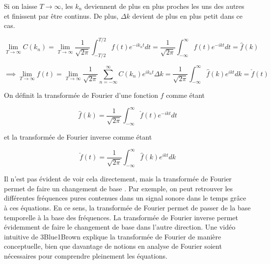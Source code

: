 Si on laisse $T \rightarrow \infty$, les $k_n$ deviennent de plus en plus proches les uns des autres et finissent par être continus. De plus, $\Delta k$ devient de plus en plus petit dans ce cas.

\begin{equation*}
    \lim_{T\rightarrow\infty} C(k_n) = \lim_{T\rightarrow\infty} \frac{1}{\sqrt{2\pi}}\int_{-T/2}^{T/2} f(t) e^{-i k_n t} dt = \frac{1}{\sqrt{2\pi}}\int_{-\infty}^{\infty} f(t) e^{-i k t} dt = \hat{f}(k)
\end{equation*}

\begin{equation*}
    \implies \lim_{T\rightarrow\infty} f(t) = \lim_{T\rightarrow\infty} \frac{1}{\sqrt{2\pi}} \sum_{n = -\infty}^{\infty} C(k_n) e^{i k_n t} \Delta k = \frac{1}{\sqrt{2\pi}} \int_{-\infty}^{\infty} \hat{f}(k) e^{ikt} dk = \check{f}(t)
\end{equation*}

On définit la transformée de Fourier d'une fonction $f$ comme étant 

\begin{equation}
    \hat{f}(k) = \frac{1}{\sqrt{2\pi}}\int_{-\infty}^{\infty} \check{f}(t) e^{-i k t} dt
\end{equation}

et la transformée de Fourier inverse comme étant 

\begin{equation}
    \check{f}(t) = \frac{1}{\sqrt{2\pi}}\int_{-\infty}^{\infty} \hat{f}(k) e^{i k t} dk
\end{equation}

Il n'est pas évident de voir cela directement, mais la transformée de Fourier permet de faire un changement de base \cite{kreyszig11}. Par exemple, on peut retrouver les différentes fréquences pures contenues dans un signal sonore dans le temps grâce à ces équations. En ce sens, la transformée de Fourier permet de passer de la base temporelle à la base des fréquences. La transformée de Fourier inverse permet évidemment de faire le changement de base dans l'autre direction. Une vidéo intuitive de 3Blue1Brown explique la transformée de Fourier de manière conceptuelle, bien que davantage de notions en analyse de Fourier soient nécessaires pour comprendre pleinement les équations.
